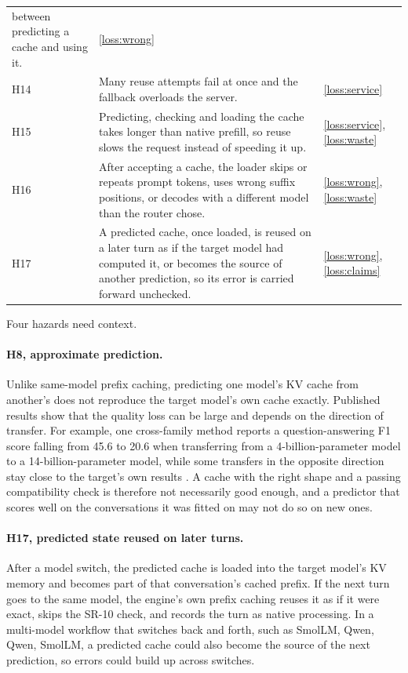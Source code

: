 \documentclass{article}
\begin{document}
\begin{longtable}{@{}p{}p{}p{}@{}}
between predicting a cache and using it. & \ref{loss:wrong}\\
H14 & Many reuse attempts fail at once and the fallback overloads the
server. & \ref{loss:service}\\
H15 & Predicting, checking and loading the cache takes longer than native
prefill, so reuse slows the request instead of speeding it up. &
\ref{loss:service}, \ref{loss:waste}\\
H16 & After accepting a cache, the loader skips or repeats prompt tokens,
uses wrong suffix positions, or decodes with a different model than the
router chose. & \ref{loss:wrong}, \ref{loss:waste}\\
H17 & A predicted cache, once loaded, is reused on a later turn as if the
target model had computed it, or becomes the source of another prediction,
so its error is carried forward unchecked. & \ref{loss:wrong},
\ref{loss:claims}\\
\bottomrule
\end{longtable}

Four hazards need context.

\paragraph{H8, approximate prediction.} Unlike same-model prefix caching,
predicting one model's KV cache from another's does not reproduce the
target model's own cache exactly. Published results show that the quality
loss can be large and depends on the direction of transfer. For example,
one cross-family method reports a question-answering F1 score falling from
45.6 to 20.6 when transferring from a 4-billion-parameter model to a
14-billion-parameter model, while some transfers in the opposite direction
stay close to the target's own results \cite{Yun2026HeteroFold}. A cache
with the right shape and a passing compatibility check is therefore not
necessarily good enough, and a predictor that scores well on the
conversations it was fitted on may not do so on new ones.

\paragraph{H17, predicted state reused on later turns.} After a model
switch, the predicted cache is loaded into the target model's KV memory and
becomes part of that conversation's cached prefix. If the next turn goes to
the same model, the engine's own prefix caching reuses it as if it were exact,
skips the SR-10 check, and records the turn as native processing. In a
multi-model workflow that switches back and forth, such as SmolLM, Qwen, Qwen,
SmolLM, a predicted cache could also become the source of the next
prediction, so errors could build up across switches.
\end{document}
